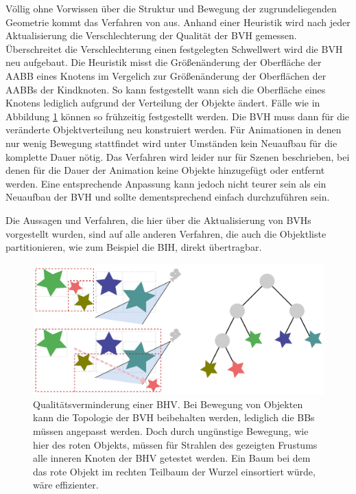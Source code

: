 Völlig ohne Vorwissen über die Struktur und Bewegung der zugrundeliegenden Geometrie kommt das Verfahren von \cite{RTDEFORM} aus. Anhand einer Heuristik wird nach jeder Aktualisierung die Verschlechterung der Qualität der BVH gemessen. Überschreitet die Verschlechterung einen festgelegten Schwellwert wird die BVH neu aufgebaut. Die Heuristik misst die Größenänderung der Oberfläche der AABB eines Knotens im Vergelich zur Größenänderung der Oberflächen der AABBs der Kindknoten. So kann festgestellt wann sich die Oberfläche eines Knotens lediglich aufgrund der Verteilung der Objekte ändert. Fälle wie in Abbildung \ref{fig:bvhdegrade} können so frühzeitig festgestellt werden. Die BVH muss dann für die veränderte Objektverteilung neu konstruiert werden. Für Animationen in denen nur wenig Bewegung stattfindet wird unter Umständen kein Neuaufbau für die komplette Dauer nötig.
Das Verfahren wird leider nur für Szenen beschrieben, bei denen für die Dauer der Animation keine Objekte hinzugefügt oder entfernt werden. Eine entsprechende Anpassung kann jedoch nicht teurer sein als ein Neuaufbau der BVH und sollte dementsprechend einfach durchzuführen sein.

Die Aussagen und Verfahren, die hier über die Aktualisierung von BVHs vorgestellt wurden, sind auf alle anderen Verfahren, die auch die Objektliste partitionieren, wie zum Beispiel die BIH, direkt übertragbar.

\begin{figure}\centering
\includegraphics[width=1.0\textwidth]{images/bvhdegrade.pdf} 
\caption[Qualitätsverminderung einer BHV]{Qualitätsverminderung einer BHV. Bei Bewegung von Objekten kann die Topologie der BVH beibehalten werden, lediglich die BBs müssen angepasst werden. Doch durch ungünstige Bewegung, wie hier des roten Objekts, müssen für Strahlen des gezeigten Frustums alle inneren Knoten der BHV getestet werden. Ein Baum bei dem das rote Objekt im rechten Teilbaum der Wurzel einsortiert würde, wäre effizienter.}
\label{fig:bvhdegrade}
\end{figure}


